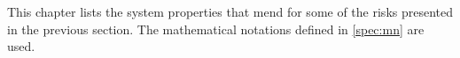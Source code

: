 

This chapter lists the system properties that mend for some of the risks presented in the previous section. The mathematical notations defined in \ref{spec:mn} are used.

